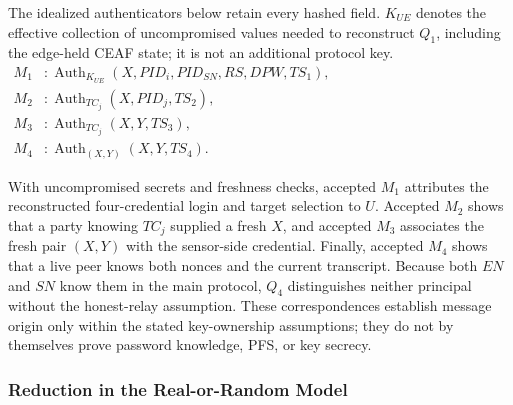 \documentclass[cmc,article,submit,moreauthors,pdftex]{Definitions/tsp}
\providecommand{\DIFdel}[1]{{\protect\color{red} \scriptsize #1}} %
\providecommand{\DIFdelend}{} %
\begin{document}
\DIFdel{The idealized authenticators below retain every hashed field. $K_{UE}$ denotes the effective collection of uncompromised values needed to reconstruct $Q_1$, including the edge-held CEAF state; it is not an additional protocol key.
}%
\DIFdel{%
\mbox{%
$\displaystyle\begin{aligned}
M_1 &: \operatorname{Auth}_{K_{UE}}(X,PID_i,PID_{SN},RS,DPW,TS_1),\\
M_2 &: \operatorname{Auth}_{TC_j}(X,PID_j,TS_2),\\
M_3 &: \operatorname{Auth}_{TC_j}(X,Y,TS_3),\\
M_4 &: \operatorname{Auth}_{(X,Y)}(X,Y,TS_4).
\end{aligned}$
}%
}%

\DIFdel{With uncompromised secrets and freshness checks, accepted $M_1$ attributes the reconstructed four-credential login and target selection to $U$. Accepted $M_2$ shows that a party knowing $TC_j$ supplied a fresh $X$, and accepted $M_3$ associates the fresh pair $(X,Y)$ with the sensor-side credential. Finally, accepted $M_4$ shows that a live peer knows both nonces and the current transcript. Because both $EN$ and $SN$ know them in the main protocol, $Q_4$ distinguishes neither principal without the honest-relay assumption. These correspondences establish message origin only within the stated key-ownership assumptions; they do not by themselves prove password knowledge, PFS, or key secrecy.
}%

\DIFdelend \subsubsection{Reduction in the Real-or-Random Model}\label{sec:ror}
\end{document}
